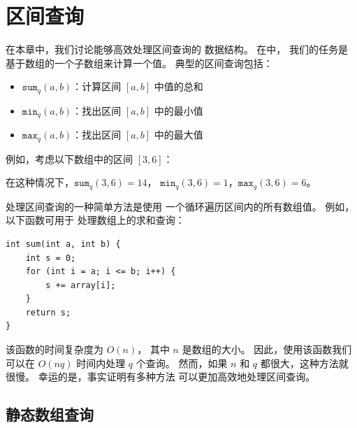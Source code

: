 \chapter{区间查询}


在本章中，我们讨论能够高效处理区间查询的
数据结构。
在中，
我们的任务是
基于数组的一个子数组来计算一个值。
典型的区间查询包括：
\begin{itemize}
\item $\texttt{sum}_q(a,b)$：计算区间 $[a,b]$ 中值的总和
\item $\texttt{min}_q(a,b)$：找出区间 $[a,b]$ 中的最小值
\item $\texttt{max}_q(a,b)$：找出区间 $[a,b]$ 中的最大值
\end{itemize}

例如，考虑以下数组中的区间 $[3,6]$：
\begin{center}
\end{center}
在这种情况下，$\texttt{sum}_q(3,6)=14$，
$\texttt{min}_q(3,6)=1$，$\texttt{max}_q(3,6)=6$。

处理区间查询的一种简单方法是使用
一个循环遍历区间内的所有数组值。
例如，以下函数可用于
处理数组上的求和查询：

\begin{lstlisting}
int sum(int a, int b) {
    int s = 0;
    for (int i = a; i <= b; i++) {
        s += array[i];
    }
    return s;
}
\end{lstlisting}

该函数的时间复杂度为 $O(n)$，
其中 $n$ 是数组的大小。
因此，使用该函数我们可以在 $O(nq)$
时间内处理 $q$ 个查询。
然而，如果 $n$ 和 $q$ 都很大，这种方法就很慢。
幸运的是，事实证明有多种方法
可以更加高效地处理区间查询。

\section{静态数组查询}

